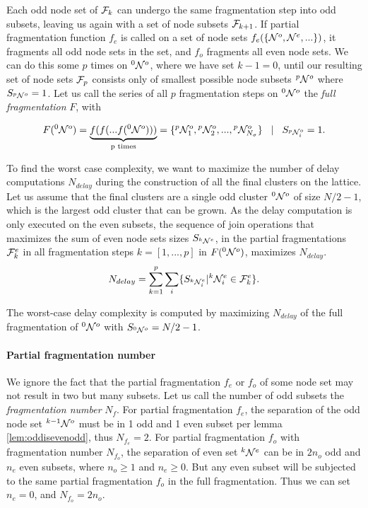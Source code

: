 Each odd node set of $\mathcal{F}_k$ can undergo the same fragmentation step into odd subsets, leaving us again with a set of node subsets $\mathcal{F}_{k+1}$. If partial fragmentation function $f_e$ is called on a set of node sets $f_e(\{\mathcal{N}^o, \mathcal{N}^e, ...\})$, it fragments all odd node sets in the set, and $f_o$ fragments all even node sets. We can do this some $p$ times on ${}^{0}\mathcal{N}^o$, where we have set $k-1=0$, until our resulting set of node sets $\mathcal{F}_{p}$ consists only of smallest possible node subsets ${}^{p}\mathcal{N}^o$ where $S_{{}^{p}\mathcal{N}^o}=1$. Let us call the series of all $p$ fragmentation steps on ${}^{0}\mathcal{N}^o$ the \emph{full fragmentation} $F$, with

\begin{equation}\label{eq:fullfrag}
    F({}^{0}\mathcal{N}^o) = \underbrace{f(f(...f({}^{0}\mathcal{N}^o)))}_\text{p times} = \{{}^{p}\mathcal{N}^{o}_1, {}^{p}\mathcal{N}^{o}_2,...,{}^{p}\mathcal{N}^{o}_{N_\sigma} \} \hspace{.3cm} | \hspace{.3cm} S_{{}^{p}\mathcal{N}^{o}_i} = 1.
  \end{equation}

To find the worst case complexity, we want to maximize the number of delay computations $N_{delay}$ during the construction of all the final clusters on the lattice. Let us assume that the final clusters are a single odd cluster ${}^{0}\mathcal{N}^o$ of size $N/2-1$, which is the largest odd cluster that can be grown. As the delay computation is only executed on the even subsets, the sequence of join operations that maximizes the sum of even node sets sizes $S_{{}^{k}\mathcal{N}^e}$, in the partial fragmentations $\mathcal{F}^e_{k}$ in all fragmentation steps $k=[1,...,p]$ in $F({}^{0}\mathcal{N}^o)$, maximizes $N_{delay}$.
\begin{equation}\label{eq:maxdelay}
  N_{delay} = \sum_{k=1}^{p} \sum_i \{ S_{{}^{k}\mathcal{N}_i^e} | {}^{k}\mathcal{N}_i^e \in \mathcal{F}^e_k \}.
\end{equation}

\begin{proposition}
  The worst-case delay complexity is computed by maximizing $N_{delay}$ of the full fragmentation of ${}^{0}\mathcal{N}^o$ with $S_{{}^{0}\mathcal{N}^o} = N/2-1$.
\end{proposition}

\paragraph{Partial fragmentation number}
We ignore the fact that the partial fragmentation $f_e$ or $f_o$ of some node set may not result in two but many subsets. Let us call the number of odd subsets the \emph{fragmentation number} $N_f$. For partial fragmentation $f_e$, the separation of the odd node set ${}^{k-1}\mathcal{N}^o$ must be in 1 odd and 1 even subset per lemma \ref{lem:oddisevenodd}, thus $N_{f_e} = 2$. For partial fragmentation $f_o$ with fragmentation number $N_{f_o}$, the separation of even set ${}^{k}\mathcal{N}^e$ can be in $2n_o$ odd and $n_e$ even subsets, where $n_o\geq 1$ and $n_e \geq 0$. But any even subset will be subjected to the same partial fragmentation $f_o$ in the full fragmentation. Thus we can set $n_e=0$, and $N_{f_o} = 2n_o$.

